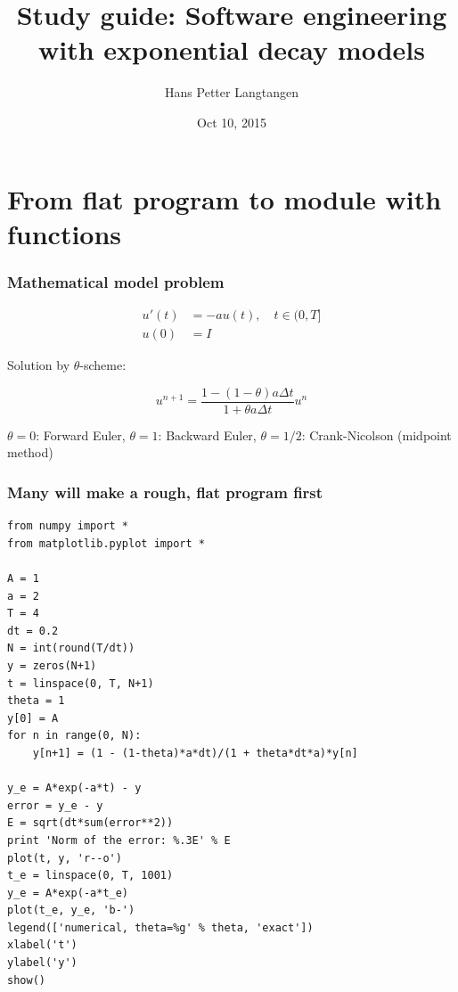 \documentclass{beamer}
\begin{document}








\title{Study guide: Software engineering with exponential decay models}


\author{Hans Petter Langtangen}

\date{Oct 10, 2015
}

\begin{frame}
\titlepage
\end{frame}

\section{From flat program to module with functions}

\begin{frame}
\frametitle{Mathematical model problem}

\begin{align*}
u'(t) &= -au(t), \quad t \in (0,T]\\ 
u(0)  &= I
\end{align*}

Solution by $\theta$-scheme:

\begin{equation*}
u^{n+1} = \frac{1 - (1-\theta) a\Delta t}{1 + \theta a\Delta t}u^n
\end{equation*}

$\theta =0$: Forward Euler, $\theta =1$: Backward Euler, $\theta =1/2$: Crank-Nicolson (midpoint method)
\end{frame}

\begin{frame}
\frametitle{Many will make a rough, flat program first}

\begin{verbatim}
from numpy import *
from matplotlib.pyplot import *

A = 1
a = 2
T = 4
dt = 0.2
N = int(round(T/dt))
y = zeros(N+1)
t = linspace(0, T, N+1)
theta = 1
y[0] = A
for n in range(0, N):
    y[n+1] = (1 - (1-theta)*a*dt)/(1 + theta*dt*a)*y[n]

y_e = A*exp(-a*t) - y
error = y_e - y
E = sqrt(dt*sum(error**2))
print 'Norm of the error: %.3E' % E
plot(t, y, 'r--o')
t_e = linspace(0, T, 1001)
y_e = A*exp(-a*t_e)
plot(t_e, y_e, 'b-')
legend(['numerical, theta=%g' % theta, 'exact'])
xlabel('t')
ylabel('y')
show()
\end{verbatim}
\end{frame}
\end{document}
